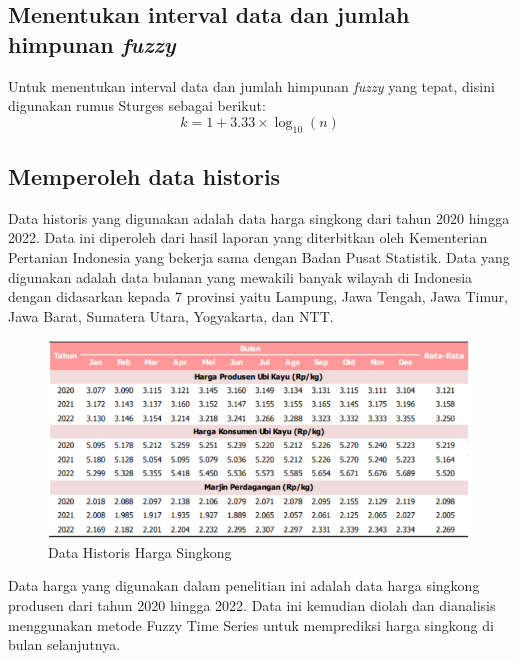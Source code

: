 \documentclass[conference]{IEEEtran}
\begin{document}
\subsection{Menentukan interval data dan jumlah himpunan \textit{fuzzy}}\label{AA}
Untuk menentukan interval data dan jumlah himpunan \textit{fuzzy} yang tepat, disini digunakan rumus Sturges sebagai berikut:
\begin{equation}
    k = 1 + 3.33 \times \log_{10}(n)
\end{equation}

\subsection{Memperoleh data historis}
Data historis yang digunakan adalah data harga singkong dari tahun 2020 hingga 2022. Data ini diperoleh dari hasil laporan yang diterbitkan oleh Kementerian Pertanian Indonesia yang bekerja sama dengan Badan Pusat Statistik. Data yang digunakan adalah data bulanan yang mewakili banyak wilayah di Indonesia dengan didasarkan kepada 7 provinsi yaitu Lampung, Jawa Tengah, Jawa Timur, Jawa Barat, Sumatera Utara, Yogyakarta, dan NTT.

\begin{figure}[H]
    \centering
    \includegraphics[scale=0.5]{images/Data Historis.png} 
    \caption{Data Historis Harga Singkong}
\end{figure}
Data harga yang digunakan dalam penelitian ini adalah data harga singkong produsen dari tahun 2020 hingga 2022. Data ini kemudian diolah dan dianalisis menggunakan metode Fuzzy Time Series untuk memprediksi harga singkong di bulan selanjutnya.
\end{document}
